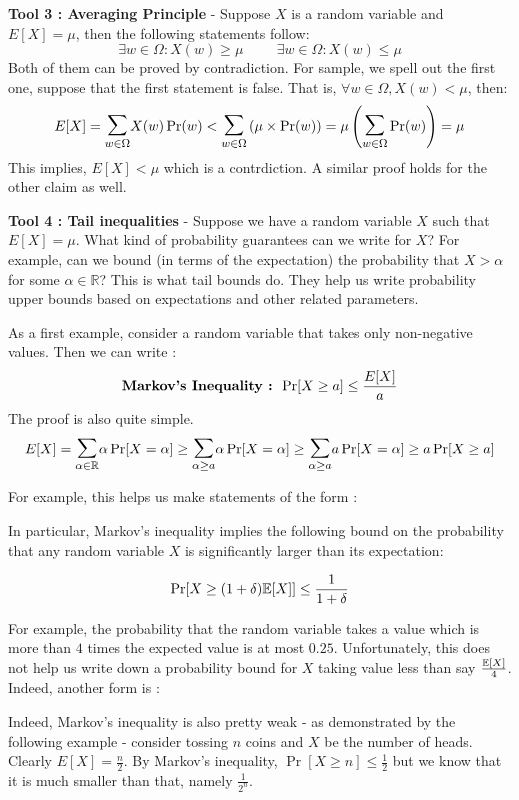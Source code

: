 \begin{description}
\item{\bf Tool 3 : Averaging Principle } - 
Suppose $X$ is a random variable and $E[X] = \mu$, then the following statements follow:
$$\exists w \in \Omega : X(w) \ge \mu \hspace{1cm} \exists w \in \Omega : X(w) \le \mu$$
Both of them can be proved by contradiction. For sample, we spell out the first one, suppose that the first statement is false. That is, $\forall w \in \Omega, X(w) < \mu$, then:
$$E[X] = \bigsum_{w \in \Omega} X(w) \Pr(w) < \bigsum_{w \in \Omega} \left( \mu \times  \Pr(w) \right) = \mu \left( \bigsum_{w \in \Omega} \Pr(w) \right) = \mu$$
This implies, $E[X] < \mu$ which is a contrdiction. A similar proof holds for the other claim as well.
\item{\bf Tool 4 : Tail inequalities} - Suppose we have a random variable $X$ such that $E[X] = \mu$. What kind of probability guarantees can we write for $X$? For example, can we bound (in terms of the expectation) the probability that $X > \alpha$ for some $\alpha \in \mathbb{R}$? This is what tail bounds do. They help us write probability upper bounds based on expectations and other related parameters. 

As a first example, consider a random variable that takes only non-negative values. Then we can write :
$$\textrm{\bf Markov's Inequality : } \Pr[X \ge a] \le \frac{E[X]}{a}$$
The proof is also quite simple.
$$
E[X] = \bigsum_{\alpha \in \mathbb{R}} \alpha \Pr[X=\alpha] 
\ge \bigsum_{\alpha \ge a} \alpha \Pr[X=\alpha] \ge 
\bigsum_{\alpha \ge a} a \Pr[X=\alpha] \ge 
a \Pr[X \ge a]$$

For example, this helps us make statements of the form :

In particular, Markov’s inequality implies the following bound on the probability that any random variable $X$ is significantly larger than its expectation:

\begin{equation}
\Pr[X \ge (1 + \delta){\mathbb E}[X]] \le \frac{1}{1+\delta}
\label{Markovs-inequality}
\end{equation}


For example, the probability that the random variable takes a value which is more than $4$ times the expected value is at most $0.25$. Unfortunately, this does not help us write down a probability bound for $X$ taking value less than say $\frac{{\mathbb E}[X]}{4}$. Indeed, another form is :

Indeed, Markov's inequality is also pretty weak - as demonstrated by the following example - consider tossing $n$ coins and $X$ be the number of heads. Clearly $E[X] = \frac{n}{2}$. By Markov's inequality, $\Pr[X \ge n] \le \frac{1}{2}$ but we know that it is much smaller than that, namely $\frac{1}{2^n}$.


\end{description}
